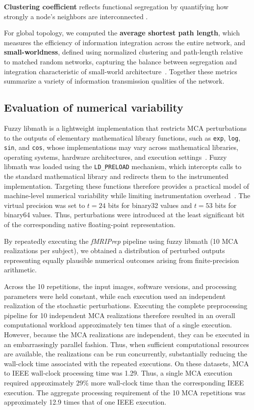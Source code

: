 \textbf{Clustering coefficient} reflects functional segregation by quantifying how strongly a node's neighbors are interconnected \cite{Rutvi2021Graphtheory}. 

For global topology, we computed the \textbf{average shortest path length}, which measures the efficiency of information integration across the entire network, and \textbf{small-worldness}, defined using normalized clustering and path-length relative to matched random networks, capturing the balance between segregation and integration characteristic of small-world architecture~\cite{Jinping2017Graphtheory}. Together these metrics summarize a variety of information transmission qualities of the network.

\subsection{Evaluation of numerical variability}


Fuzzy libmath is a lightweight implementation that restricts MCA perturbations to the outputs of elementary mathematical library functions, such as \texttt{exp}, \texttt{log}, \texttt{sin}, and \texttt{cos}, whose implementations may vary across mathematical libraries, operating systems, hardware architectures, and execution settings~\cite{Glatard2015}. Fuzzy libmath was loaded using the \texttt{LD\_PRELOAD} mechanism, which intercepts calls to the standard mathematical library and redirects them to the instrumented implementation. Targeting these functions therefore provides a practical model of machine-level numerical variability while limiting instrumentation overhead~\cite{Salari2021}. The virtual precision was set to \(t=24\) bits for binary32 values and \(t=53\) bits for binary64 values. Thus, perturbations were introduced at the least significant bit of the corresponding native floating-point representation.

By repeatedly executing the \textit{fMRIPrep} pipeline using fuzzy libmath (10 MCA realizations per subject), we obtained a distribution of perturbed outputs representing equally plausible numerical outcomes arising from finite-precision arithmetic.

Across the 10 repetitions, the input images, software versions, and processing parameters were held constant, while each execution used an independent realization of the stochastic perturbations. Executing the complete preprocessing pipeline for 10 independent MCA realizations therefore resulted in an overall computational workload approximately ten times that of a single execution. However, because the MCA realizations are independent, they can be executed in an embarrassingly parallel fashion. Thus, when sufficient computational resources are available, the realizations can be run concurrently, substantially reducing the wall-clock time associated with the repeated executions.
On these datasets, MCA to IEEE wall-clock processing time was 1.29. Thus, a single MCA execution
required approximately 29\% more wall-clock time than the corresponding IEEE execution. The aggregate processing requirement of the 10 MCA repetitions was approximately 12.9 times that of one IEEE execution.

